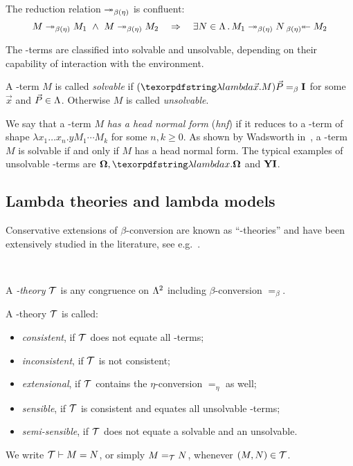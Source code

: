 \begin{thm}
The reduction relation $\msto[\beta(\eta)]$ is confluent:
\[
M\msto[\beta(\eta)] M_1 \und M\msto[\beta(\eta)]M_2\imp \exists N\in\Lam\,.\,
M_1\msto[\beta(\eta)] N \invredd[\beta(\eta)]M_2
\]
\end{thm}
The \lam-terms are classified into solvable and unsolvable, depending on their capability of interaction with the environment.
\begin{defi}
A \lam-term $M$ is called \emph{solvable} if $(\lam\vec x.M)\vec P =_\beta \comb{I}$ for some $\vec x$ and $\vec P\in\Lam$. Otherwise $M$ is called \emph{unsolvable}.
\end{defi}
We say that a \lam-term $M$ \emph{has a head normal form} (\emph{hnf}) if it reduces to a \lam-term of shape $\lambda x_{1}\ldots x_{n}.yM_{1}\cdots M_{k}$ for some $n,k\ge 0$.
As shown by Wadsworth in~\cite{Wadsworth76}, a \lam-term $M$ is solvable if and only if $M$ has a head normal form.
The typical examples of unsolvable \lam-terms are $\Om, \lam x.\Om$ and $\comb{YI}$.

\subsection{Lambda theories and lambda models}

Conservative extensions of $\beta$-conversion are known as ``\lam-theories'' and have been extensively studied in the literature, see e.g.~\cite{Bare,LusinS04,IntrigilaMP19,IntrigilaS17,ManzonettoPSS19}.

\begin{defi}\
\bsub
\item A \emph{\lam-theory} $\cT$ is any congruence on $\Lam^2$ including $\beta$-conversion $=_\beta$.
\item A \lam-theory $\cT$ is called:
\begin{itemize}
\item \emph{consistent}, if $\cT$ does not equate all \lam-terms;
\item \emph{inconsistent}, if $\cT$ is not consistent;
\item \emph{extensional}, if $\cT$ contains the $\eta$-conversion $=_\eta$ as well;
\item \emph{sensible}, if $\cT$ is consistent and equates all unsolvable \lam-terms;
\item \emph{semi-sensible}, if $\cT$ does not equate a solvable and an unsolvable.
\end{itemize}
\esub
We write $\cT\vdash M = N$, or simply $M =_\cT N$, whenever $(M,N)\in\cT$.
\end{defi}

